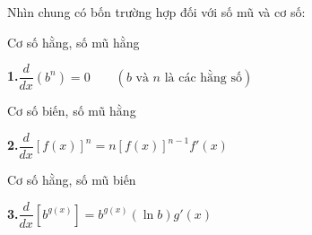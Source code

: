 \noindent
\begin{minipage}[t]{\leftcolwidth}
  \vspace{0pt}\raggedleft
  \raisebox{-0.2ex}{\warningicon}\hspace{6pt}
\end{minipage}\hfill
\begin{minipage}[t]{\rightcolwidth}
  \vspace{0pt}
  \par\vspace{8pt}
  \noindent Nhìn chung có bốn trường hợp đối với số mũ và cơ số:
\end{minipage}

\vspace{10pt}

\noindent
\begin{minipage}[t]{\leftcolwidth}\raggedright
  \small\textsf{\color{stewartcyan}Cơ số hằng, số mũ hằng}
\end{minipage}\hfill
\begin{minipage}[t]{\rightcolwidth}
  \textbf{1.}\quad $\dfrac{d}{dx}(b^n) = 0 \qquad (b \text{ và } n \text{ là các hằng số})$
\end{minipage}

\vspace{12pt}

\noindent
\begin{minipage}[t]{\leftcolwidth}\raggedright
  \small\textsf{\color{stewartcyan}Cơ số biến, số mũ hằng}
\end{minipage}\hfill
\begin{minipage}[t]{\rightcolwidth}
  \textbf{2.}\quad $\dfrac{d}{dx}[f(x)]^n = n[f(x)]^{n-1} f'(x)$
\end{minipage}

\vspace{12pt}

\noindent
\begin{minipage}[t]{\leftcolwidth}\raggedright
  \small\textsf{\color{stewartcyan}Cơ số hằng, số mũ biến}
\end{minipage}\hfill
\begin{minipage}[t]{\rightcolwidth}
  \textbf{3.}\quad $\dfrac{d}{dx}[b^{g(x)}] = b^{g(x)}(\ln b) g'(x)$
\end{minipage}

